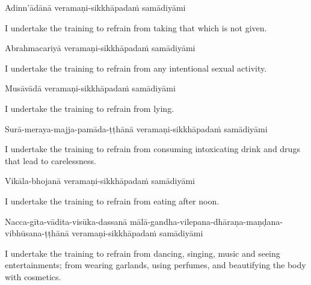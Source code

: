 Adinn'ādānā veramaṇi-sikkhāpadaṁ samādiyāmi

\begin{english-hang}
  I undertake the training to refrain from taking that which is not given.
\end{english-hang}

Abrahmacariyā veramaṇi-sikkhāpadaṁ samādiyāmi

\begin{english-hang}
  I undertake the training to refrain from any intentional sexual activity.
\end{english-hang}

Musāvādā veramaṇi-sikkhāpadaṁ samādiyāmi

\begin{english}
  I undertake the training to refrain from lying.
\end{english}

\begin{pali-hang}
  Surā-meraya-majja-pamāda-ṭṭhānā veramaṇi-sikkhāpadaṁ samādiyāmi
\end{pali-hang}

\begin{english-hang}
  I undertake the training to refrain from consuming intoxicating drink and drugs that\makeatletter\hyperlink{endnote141-appendix}\makeatother
  lead to carelessness.
\end{english-hang}

Vikāla-bhojanā veramaṇi-sikkhāpadaṁ samādiyāmi

\begin{english}
  I undertake the training to refrain from eating after noon.\makeatletter\hyperlink{endnote142-appendix}\makeatother
\end{english}

\begin{pali-hang}
  Nacca-gīta-vādita-visūka-dassanā mālā-gandha-vilepana-dhāraṇa-maṇḍana-vibhūsana-ṭṭhānā veramaṇi-sikkhāpadaṁ samādiyāmi
\end{pali-hang}

\begin{english-hang}
  I undertake the training to refrain from dancing, singing, music and seeing entertainments; from wearing garlands, using perfumes, and beautifying the body with cosmetics.\makeatletter\hyperlink{endnote143-appendix}\makeatother
\end{english-hang}

